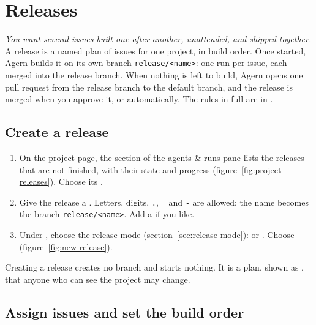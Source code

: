 \chapter{Releases}\label{ch:releases}

\emph{You want several issues built one after another, unattended, and shipped together.} A
release is a named plan of issues for one project, in build order. Once started, Agern builds it
on its own branch \texttt{release/<name>}: one run per issue, each merged into the release
branch. When nothing is left to build, Agern opens one pull request from the release branch to
the default branch, and the release is merged when you approve it, or automatically. The rules in
full are in .

\section{Create a release}\label{sec:create-release}

\begin{enumerate}
  \item On the project page, the  section of the agents \& runs pane lists the releases
    that are not finished, with their state and progress (figure~\ref{fig:project-releases}).
    Choose its .
  \item Give the release a . Letters, digits, \texttt{.}, \texttt{\_} and \texttt{-} are
    allowed; the name becomes the branch \texttt{release/<name>}. Add a  if you like.
  \item Under , choose the release mode (section~\ref{sec:release-mode}):
     or . Choose 
    (figure~\ref{fig:new-release}).
\end{enumerate}

Creating a release creates no branch and starts nothing. It is a plan, shown as ,
that anyone who can see the project may change.



\section{Assign issues and set the build order}\label{sec:assign}

